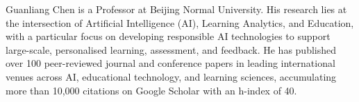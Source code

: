 Guanliang Chen is a Professor at Beijing Normal University. His research lies at the intersection of Artificial Intelligence (AI), Learning Analytics, and Education, with a particular focus on developing responsible AI technologies to support large-scale, personalised learning, assessment, and feedback. He has published over 100 peer-reviewed journal and conference papers in leading international venues across AI, educational technology, and learning sciences, accumulating more than 10,000 citations on Google Scholar with an h-index of 40.

